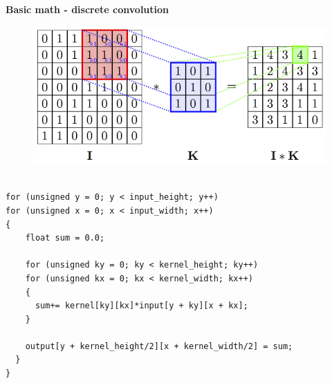 \documentclass[xcolor=dvipsnames]{beamer}
\begin{document}
\begin{frame}[fragile]
{\bf Basic math - discrete convolution}

\begin{figure}
  \includegraphics[scale=0.2]{../../diagrams/convolution_2d.png}
\end{figure}


\begin{lstlisting}

for (unsigned y = 0; y < input_height; y++)
for (unsigned x = 0; x < input_width; x++)
{
    float sum = 0.0;

    for (unsigned ky = 0; ky < kernel_height; ky++)
    for (unsigned kx = 0; kx < kernel_width; kx++)
    {
      sum+= kernel[ky][kx]*input[y + ky][x + kx];
    }

    output[y + kernel_height/2][x + kernel_width/2] = sum;
  }
}
\end{lstlisting}
\end{frame}
\end{document}
